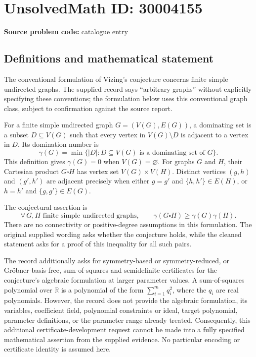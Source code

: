 \documentclass[11pt]{article}
\newcommand{\R}{\mathbb{R}}
\begin{document}
\section*{UnsolvedMath ID: 30004155}
\textbf{Source problem code:} catalogue entry
\subsection{Definitions and mathematical statement}
The conventional formulation of Vizing's conjecture concerns finite simple undirected graphs. The supplied record says ``arbitrary graphs'' without explicitly specifying these conventions; the formulation below uses this conventional graph class, subject to confirmation against the source report.

For a finite simple undirected graph \(G=(V(G),E(G))\), a dominating set is a subset \(D\subseteq V(G)\) such that every vertex in \(V(G)\setminus D\) is adjacent to a vertex in \(D\). Its domination number is
\[
\gamma(G)=\min\{\lvert D\rvert:D\subseteq V(G)\text{ is a dominating set of }G\}.
\]
This definition gives \(\gamma(G)=0\) when \(V(G)=\varnothing\). For graphs \(G\) and \(H\), their Cartesian product \(G\square H\) has vertex set \(V(G)\times V(H)\). Distinct vertices \((g,h)\) and \((g',h')\) are adjacent precisely when either \(g=g'\) and \(\{h,h'\}\in E(H)\), or \(h=h'\) and \(\{g,g'\}\in E(G)\).

The conjectural assertion is
\[
\forall\,G,H\text{ finite simple undirected graphs},\qquad
\gamma(G\square H)\geq\gamma(G)\gamma(H).
\]
There are no connectivity or positive-degree assumptions in this formulation. The original supplied wording asks whether the conjecture holds, while the cleaned statement asks for a proof of this inequality for all such pairs.

The record additionally asks for symmetry-based or symmetry-reduced, or Gröbner-basis-free, sum-of-squares and semidefinite certificates for the conjecture's algebraic formulation at larger parameter values. A sum-of-squares polynomial over \(\R\) is a polynomial of the form \(\sum_{i=1}^{m}q_i^2\), where the \(q_i\) are real polynomials. However, the record does not provide the algebraic formulation, its variables, coefficient field, polynomial constraints or ideal, target polynomial, parameter definitions, or the parameter range already treated. Consequently, this additional certificate-development request cannot be made into a fully specified mathematical assertion from the supplied evidence. No particular encoding or certificate identity is assumed here.
\end{document}
